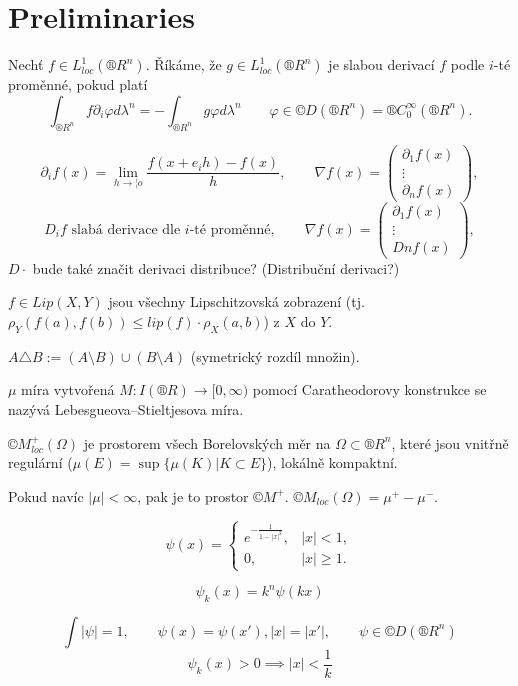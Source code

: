 \documentclass[12pt]{article}					%
\begin{document}

\section{Preliminaries}
\begin{definice}
	Nechť $f \in L^1_{loc}(®R^n)$. Říkáme, že $g \in L^1_{loc}(®R^n)$ je slabou derivací $f$ podle $i$-té proměnné, pokud platí
	$$ \int_{®R^n} f \partial_i φ dλ^n = - \int_{®R^n} g φ dλ^n \qquad φ \in ©D(®R^n) = ®C^∞_0(®R^n). $$
\end{definice}

\begin{definice}[Značení]
	$$ \partial_i f(x) = \lim_{h \rightarrow ¦o} \frac{f(x + e_i h) - f(x)}{h}, \qquad \nabla f(x) = \begin{pmatrix} \partial_1f(x) \\ \vdots\\ \partial_n f(x) \end{pmatrix}, $$
	$$ D_if \text{ slabá derivace dle $i$-té proměnné}, \qquad \nabla f(x) = \begin{pmatrix} \partial_1f(x) \\ \vdots\\ Dn f(x) \end{pmatrix}, $$
	$D·$ bude také značit derivaci distribuce? (Distribuční derivaci?)

	$f \in Lip(X, Y)$ jsou všechny Lipschitzovská zobrazení (tj. $ρ_Y(f(a), f(b)) ≤ lip(f)·ρ_X(a, b)$) z $X$ do $Y$.

	$A \triangle B := (A \setminus B) \cup (B \setminus A)$ (symetrický rozdíl množin).
\end{definice}

\begin{definice}
	$μ$ míra vytvořená $M: I(®R) \rightarrow [0, ∞)$ pomocí Caratheodorovy konstrukce se nazývá Lebesgueova–Stieltjesova míra.
\end{definice}

\begin{definice}
	$©M^+_{loc}(Ω)$ je prostorem všech Borelovských měr na $Ω \subset ®R^n$, které jsou vnitřně regulární ($μ(E) = \sup\{\mu(K) | K \subset E\}$), lokálně kompaktní.

	Pokud navíc $|μ| < ∞$, pak je to prostor $©M^+$. $©M_{loc}(Ω) = μ^+ - μ^-$.
\end{definice}

\begin{definice}[?]
	$$ ψ(x) = \begin{cases}e^{-\frac{1}{1 - |x|^2}}, & |x| < 1,\\ 0, & |x| ≥ 1.\end{cases} $$

	$$ ψ_k(x) = k^n ψ(kx) $$

	\begin{poznamkain}
		$$\int |ψ| = 1, \qquad ψ(x) = ψ(x'), |x| = |x'|, \qquad ψ \in ©D(®R^n) $$
		$$ ψ_k(x) > 0 \implies |x| < \frac{1}{k} $$
	\end{poznamkain}
\end{definice}
\end{document}
